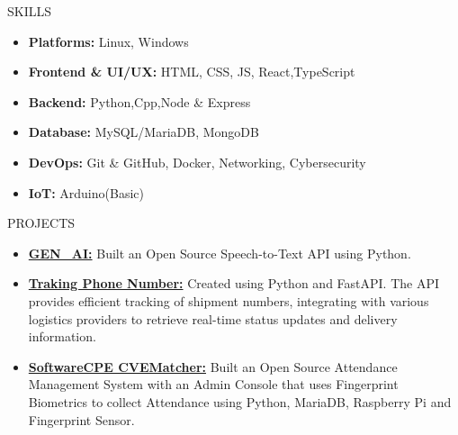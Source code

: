 \documentclass{resume}
\begin{document}
\vspace{-0.4em}

\begin{rSection}{SKILLS}
    \begin{itemize}
        \item \textbf{Platforms:} Linux, Windows
              \vspace{-0.4em}
        \item \textbf{Frontend \& UI/UX: } HTML, CSS, JS, React,TypeScript
              \vspace{-0.4em}
        \item \textbf{Backend: } Python,Cpp,Node \& Express
              \vspace{-0.4em}
        \item \textbf{Database: } MySQL/MariaDB, MongoDB
              \vspace{-0.4em}
        \item \textbf{DevOps:} Git \& GitHub, Docker, Networking, Cybersecurity
              \vspace{-0.4em}
        \item \textbf{IoT:} Arduino(Basic)
    \end{itemize}
\end{rSection}
\vspace{-0.4em}

\begin{rSection}{PROJECTS}
    \begin{itemize}
        \item \textbf{\href{https://github.com/trishaamandal/Gen-AI}{GEN\_AI:}} {Built an Open Source Speech-to-Text API using Python.}
        \item \textbf{\href{https://github.com/trishaamandal/tracking_number}{Traking Phone Number:}} {Created using Python and FastAPI. The API provides efficient tracking of shipment numbers, integrating with various logistics providers to retrieve real-time status updates and delivery information.}
        \item \textbf{\href{https://github.com/trishaamandal/SoftwareCPE-CVE}{SoftwareCPE CVEMatcher:}} {Built an Open Source Attendance Management System with an Admin Console that uses Fingerprint Biometrics to collect Attendance using Python, MariaDB, Raspberry Pi and Fingerprint Sensor.}

    \end{itemize}
\end{rSection}
\vspace{-0.4em}
\end{document}
